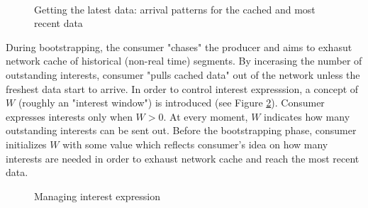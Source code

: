 \documentclass{icn/sig-alternate-2012} %
\begin{document}
\begin{figure}[t!]
\centering

\\

\caption{Getting the latest data: arrival patterns for the cached and most recent data}
\label{fig:inter-arrival}
\end{figure}

During bootstrapping, the consumer "chases" the producer and aims to exhasut network cache of historical (non-real time) segments. By incerasing the number of outstanding interests, consumer "pulls cached data" out of the network unless the freshest data start to arrive. In order to control interest expresssion, a concept of $W$ (roughly an "interest window") is introduced (see Figure \ref{fig:w-concept}). Consumer expresses interests only when $W > 0$. At every moment, $W$ indicates how many outstanding interests can be sent out. Before the bootstrapping phase, consumer initializes $W$ with some value which reflects consumer's idea on how many interests are needed in order to exhaust network cache and reach the most recent data. 

\begin{figure}[t!]
\centering


\caption{Managing interest expression}
\label{fig:w-concept}
\end{figure}
\end{document}
